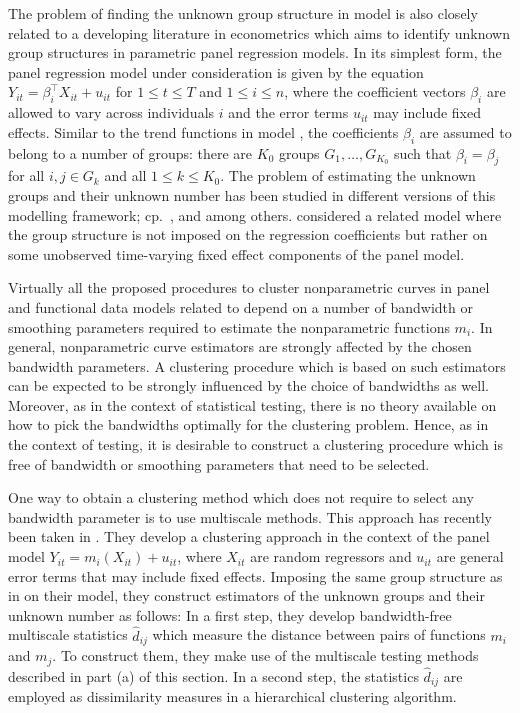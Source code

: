 \documentclass[a4paper,12pt]{article}
\makeatletter
\renewcommand{\eqref}[1]{\tagform@{\ref{#1}}}
\makeatother
\begin{document}
The problem of finding the unknown group structure in model \eqref{model} is also closely related to a developing literature in econometrics which aims to identify unknown group structures in parametric panel regression models. In its simplest form, the panel regression model under consideration is given by the equation $Y_{it} = \beta_i^\top X_{it} + u_{it}$ for $1 \le t \le T$ and $1 \le i \le n$, where the coefficient vectors $\beta_i$ are allowed to vary across individuals $i$ and the error terms $u_{it}$ may include fixed effects. Similar to the trend functions in model \eqref{model}, the coefficients $\beta_i$ are assumed to belong to a number of groups: there are $K_0$ groups $G_1,\ldots,G_{K_0}$ such that $\beta_i = \beta_j$ for all $i,j \in G_k$ and all $1\le k \le K_0$. The problem of estimating the unknown groups and their unknown number has been studied in different versions of this modelling framework; cp.\ \cite{Su2016}, \cite{Su2018} and \cite{Wang2018} among others. \cite{Bonhomme2015} considered a related model where the group structure is not imposed on the regression coefficients but rather on some unobserved time-varying fixed effect components of the panel model. 


Virtually all the proposed procedures to cluster nonparametric curves in panel and functional data models related to \eqref{model} depend on a number of bandwidth or smoothing parameters required to estimate the nonparametric functions $m_i$. In general, nonparametric curve estimators are strongly affected by the chosen bandwidth parameters. A clustering procedure which is based on such estimators can be expected to be strongly influenced by the choice of bandwidths as well. Moreover, as in the context of statistical testing, there is no theory available on how to pick the bandwidths optimally for the clustering problem. Hence, as in the context of testing, it is desirable to construct a clustering procedure which is free of bandwidth or smoothing parameters that need to be selected. 


One way to obtain a clustering method which does not require to select any bandwidth parameter is to use multiscale methods. This approach has recently been taken in \cite{VogtLinton2018}. They develop a clustering approach in the context of the panel model $Y_{it} = m_i(X_{it}) + u_{it}$, where $X_{it}$ are random regressors and $u_{it}$ are general error terms that may include fixed effects. Imposing the same group structure as in \eqref{model-groups} on their  model, they construct estimators of the unknown groups and their unknown number as follows: In a first step, they develop bandwidth-free multiscale statistics $\hat{d}_{ij}$ which measure the distance between pairs of functions $m_i$ and $m_j$. To construct them, they make use of the multiscale testing methods described in part (a) of this section. In a second step, the statistics $\hat{d}_{ij}$ are employed as dissimilarity measures in a hierarchical clustering algorithm. 
\end{document}
